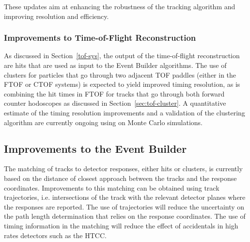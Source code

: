 These updates aim at enhancing the robustness of the tracking algorithm and improving resolution and efficiency.

\subsubsection{Improvements to Time-of-Flight Reconstruction}

As discussed in Section~\ref{tof-sys}, the output of the time-of-flight reconstruction are hits that are used
as input to the Event Builder algorithms. The use of clusters for particles that go through two adjacent TOF
paddles (either in the FTOF or CTOF systems) is expected to yield improved timing resolution, as is combining
the hit times in FTOF for tracks that go through both forward counter hodoscopes as discussed in
Section~\ref{sec:tof-cluster}. A quantitative estimate of the timing resolution improvements and a validation of
the clustering algorithm are currently ongoing using on Monte Carlo simulations.

\subsection{Improvements to the Event Builder}

The matching of tracks to detector responses, either hits or clusters, is currently based on the distance of closest
approach between the tracks and the response coordinates. Improvements to this matching can be obtained using
track trajectories, i.e. intersections of the track with the relevant detector planes where the responses are reported.
The use of trajectories will reduce the uncertainty on the path length determination that relies on the response
coordinates. The use of timing information in the matching will reduce the effect of accidentals in high rates detectors
such as the HTCC.


